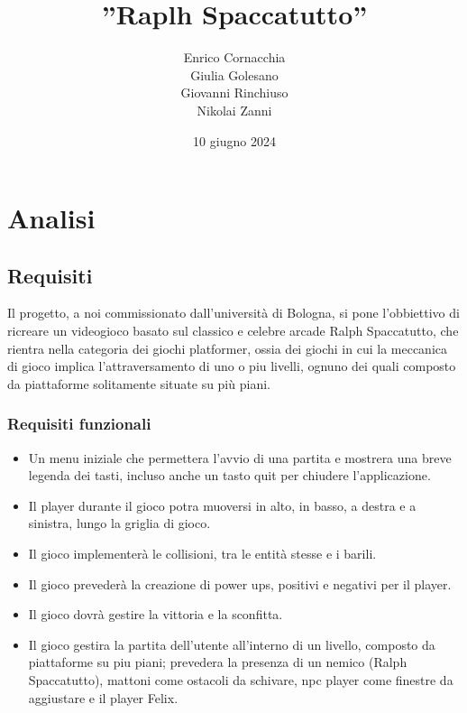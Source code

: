\title{''Raplh Spaccatutto''}

\author{Enrico Cornacchia \\ Giulia Golesano \\ Giovanni Rinchiuso \\ Nikolai Zanni}
\date{10 giugno 2024}



\maketitle

\tableofcontents

\chapter{Analisi}

\section{Requisiti}

Il progetto, a noi commissionato dall'università di Bologna, si pone l'obbiettivo di ricreare un videogioco basato sul classico e celebre arcade Ralph Spaccatutto, che rientra nella categoria dei giochi platformer, ossia dei giochi in cui la meccanica di gioco implica l'attraversamento di uno o piu livelli, ognuno dei quali composto da piattaforme solitamente situate su più piani.

\subsection{Requisiti funzionali}

\begin{itemize}
	\item Un menu iniziale che permettera l’avvio di una partita e mostrera una breve legenda dei tasti, incluso anche un tasto quit per chiudere l’applicazione.
	\item Il player durante il gioco potra muoversi in alto, in basso, a destra e a sinistra, lungo la griglia di gioco.
	\item Il gioco implementerà le collisioni, tra le entità stesse e i barili.
	\item Il gioco prevederà la creazione di power ups, positivi e negativi per il player.
	\item Il gioco dovrà gestire la vittoria e la sconfitta.
	\item Il gioco gestira la partita dell'utente all'interno di un livello, composto da piattaforme su piu piani; prevedera la presenza di un nemico (Ralph Spaccatutto), mattoni come ostacoli da schivare, npc player come finestre da aggiustare e il player Felix. 
\end{itemize}


